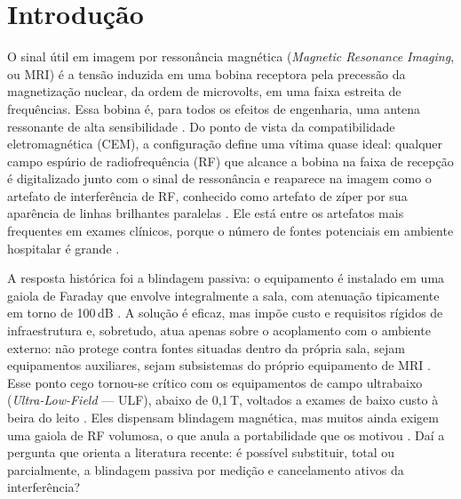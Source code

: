 \documentclass[portuguese]{sbcreviews-2025}%
\begin{document}
\section{Introdução}
\label{sec:intro}

O sinal útil em imagem por ressonância magnética (\textit{Magnetic Resonance Imaging}, ou MRI) é a tensão induzida em uma bobina receptora pela precessão da magnetização nuclear, da ordem de microvolts, em uma faixa estreita de frequências. Essa bobina é, para todos os efeitos de engenharia, uma antena ressonante de alta sensibilidade \citep{kwok2024rf}. Do ponto de vista da compatibilidade eletromagnética (CEM), a configuração define uma vítima quase ideal: qualquer campo espúrio de radiofrequência (RF) que alcance a bobina na faixa de recepção é digitalizado junto com o sinal de ressonância e reaparece na imagem como o artefato de interferência de RF, conhecido como artefato de zíper por sua aparência de linhas brilhantes paralelas \citep{kwok2024rf}. Ele está entre os artefatos mais frequentes em exames clínicos, porque o número de fontes potenciais em ambiente hospitalar é grande \citep{kwok2024rf}.

A resposta histórica foi a blindagem passiva: o equipamento é instalado em uma gaiola de Faraday que envolve integralmente a sala, com atenuação tipicamente em torno de 100\,dB \citep{kwok2024rf, kellogg2021navigating}. A solução é eficaz, mas impõe custo e requisitos rígidos de infraestrutura \citep{zhao2024emi} e, sobretudo, atua apenas sobre o acoplamento com o ambiente externo: não protege contra fontes situadas dentro da própria sala, sejam equipamentos auxiliares, sejam subsistemas do próprio equipamento de MRI \citep{kwok2024rf, zhao2024emi}. Esse ponto cego tornou-se crítico com os equipamentos de campo ultrabaixo (\textit{Ultra-Low-Field} --- ULF), abaixo de 0,1\,T, voltados a exames de baixo custo à beira do leito \citep{marques2019lowfield, liu2021lowcost}. Eles dispensam blindagem magnética, mas muitos ainda exigem uma gaiola de RF volumosa, o que anula a portabilidade que os motivou \citep{zhao2024emi}. Daí a pergunta que orienta a literatura recente: é possível substituir, total ou parcialmente, a blindagem passiva por medição e cancelamento ativos da interferência?
\end{document}
